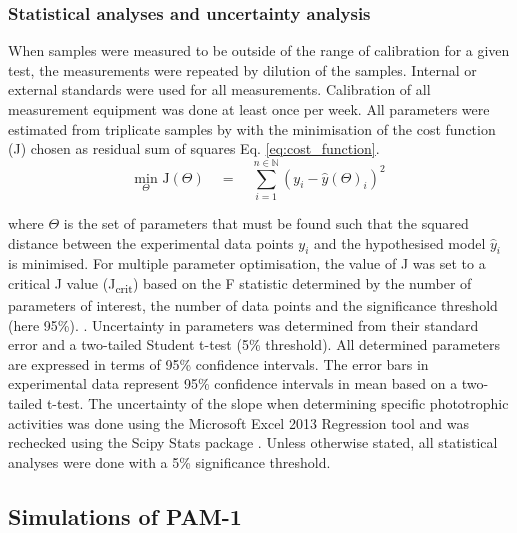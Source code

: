 \subsubsection{Statistical analyses and uncertainty analysis}
When samples were measured to be outside of the range of calibration for a given test, the measurements were repeated by dilution of the samples. Internal or external standards were used for all measurements. Calibration of all measurement equipment was done at least once per week. All parameters were estimated from triplicate samples by with the minimisation of the cost function (J) chosen as residual sum of squares Eq. \eqref{eq:cost_function}.
\begin{equation}
    \label{eq:cost_function}
    \underset{\Theta}{\mathrm{min}}\, \, \mathrm{J}(\Theta)\quad  = \quad \sum_{i = 1}^{n\in\mathbb{N}} \left(y_i - \hat{y}(\Theta)_i    \right)^2
\end{equation}

\noindent where $\Theta$ is the set of parameters that must be found such that the squared distance between the experimental data points $y_i$ and the hypothesised model $\hat{y}_i$ is minimised. For multiple parameter optimisation, the value of J was set to a critical J value (J\textsubscript{crit}) based on the F statistic determined by the number of parameters of interest, the number of data points and the significance threshold (here 95\%). \cite{batstone2003}. Uncertainty in parameters was determined from their standard error and a two-tailed Student t-test (5\% threshold). All determined parameters are expressed in terms of 95\% confidence intervals. The error bars in experimental data represent 95\% confidence intervals in mean based on a two-tailed t-test. The uncertainty of the slope when determining specific phototrophic activities was done using the Microsoft Excel 2013 Regression tool and was rechecked using the Scipy Stats package \cite{jones2001}. Unless otherwise stated, all statistical analyses were done with a 5\% significance threshold.

\subsection{Simulations of PAM-1}


